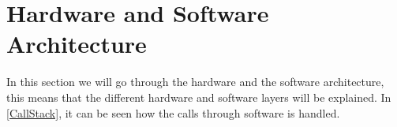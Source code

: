 \section{Hardware and Software Architecture}

In this section we will go through the hardware and the software architecture,
this means that the different hardware and software layers will be explained. In
\autoref{CallStack}, it can be seen how the calls through software is handled. 


